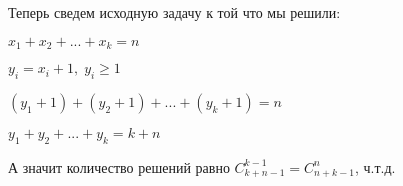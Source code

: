 \begin{itemize}
	Теперь сведем исходную задачу к той что мы решили:
	
	$x_1 + x_2 + ... + x_k = n$
	
	$y_i = x_i + 1, \; y_i \geqslant 1$
	
	$(y_1 + 1) + (y_2 + 1) + ... + (y_k + 1) = n$
	
	$y_1 + y_2 + ... + y_k = k + n$
	
	А значит количество решений равно $C^{k-1}_{k+n-1} = C^{n}_{n+k-1}$, ч.т.д.
\end{itemize}